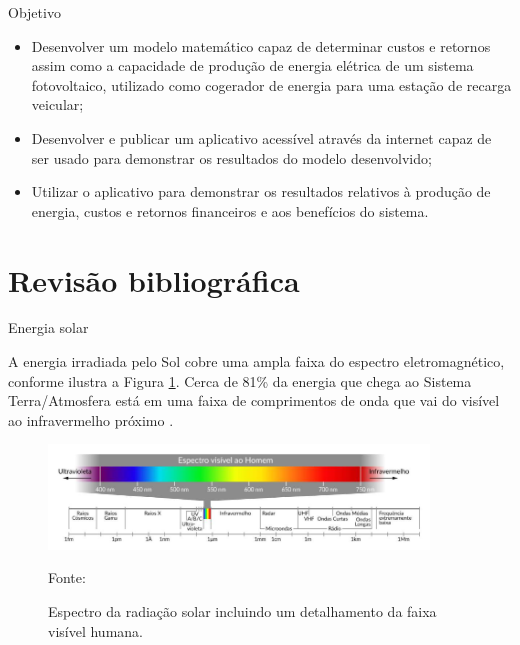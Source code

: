 \documentclass{beamer}
\begin{document}
\begin{frame}{Objetivo}

  \begin{itemize}
  
    \item Desenvolver um modelo matemático capaz de determinar custos e retornos assim como a capacidade de produção de energia elétrica de um sistema fotovoltaico, utilizado como cogerador de energia para uma estação de recarga veicular;
    
    \item Desenvolver e publicar um aplicativo acessível através da internet capaz de ser usado para demonstrar os resultados do modelo desenvolvido;
    
    \item Utilizar o aplicativo para demonstrar os resultados relativos à produção de energia, custos e retornos financeiros e aos benefícios do sistema.
      
  \end{itemize}

\end{frame}


\section{Revisão bibliográfica}


\begin{frame}{Energia solar}

 A energia irradiada pelo Sol cobre uma ampla faixa do espectro eletromagnético, conforme ilustra a Figura \ref{fig:irrad_solar}. Cerca de 81\% da energia que chega ao Sistema Terra/Atmosfera está em uma faixa de comprimentos de onda que vai do visível ao infravermelho próximo \cite{atlas2017}.
 
\begin{figure}[H]
    \centering
    \includegraphics[width=0.9\textwidth]{./Figuras/irrad_solar.png}
    \caption{Espectro da radiação solar incluindo um detalhamento da faixa visível humana.}{Fonte: \cite{atlas2017}}
   \label{fig:irrad_solar}
\end{figure}

\end{frame}
\end{document}
